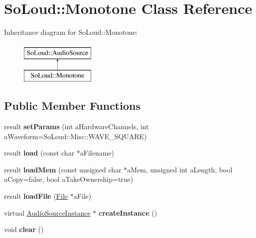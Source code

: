 \hypertarget{class_so_loud_1_1_monotone}{}\section{So\+Loud\+::Monotone Class Reference}
\label{class_so_loud_1_1_monotone}
Inheritance diagram for So\+Loud\+::Monotone\+:\begin{figure}[H]
\begin{center}
\leavevmode
\includegraphics[height=2.000000cm]{class_so_loud_1_1_monotone}
\end{center}
\end{figure}
\subsection*{Public Member Functions}
\begin{DoxyCompactItemize}
\item 
\mbox{\label{class_so_loud_1_1_monotone_a542d672e117a8f475165056a81119890}} 
result {\bfseries set\+Params} (int a\+Hardware\+Channels, int a\+Waveform=So\+Loud\+::\+Misc\+::\+W\+A\+V\+E\+\_\+\+S\+Q\+U\+A\+RE)
\item 
\mbox{\label{class_so_loud_1_1_monotone_a19e67a5264c13d870f4c3530b77bc734}} 
result {\bfseries load} (const char $\ast$a\+Filename)
\item 
\mbox{\label{class_so_loud_1_1_monotone_a7f067b1c334aa0a05fe99b438b1b5d4c}} 
result {\bfseries load\+Mem} (const unsigned char $\ast$a\+Mem, unsigned int a\+Length, bool a\+Copy=false, bool a\+Take\+Ownership=true)
\item 
\mbox{\label{class_so_loud_1_1_monotone_ad78047cde881908f8b9c4a198243aa56}} 
result {\bfseries load\+File} (\mbox{\hyperlink{class_so_loud_1_1_file}{File}} $\ast$a\+File)
\item 
\mbox{\label{class_so_loud_1_1_monotone_a2ea629c040e8360498f6aa28bdebba35}} 
virtual \mbox{\hyperlink{class_so_loud_1_1_audio_source_instance}{Audio\+Source\+Instance}} $\ast$ {\bfseries create\+Instance} ()
\item 
\mbox{\label{class_so_loud_1_1_monotone_a2be81352ed0fc38f03530aa241e6a353}} 
void {\bfseries clear} ()
\end{DoxyCompactItemize}
